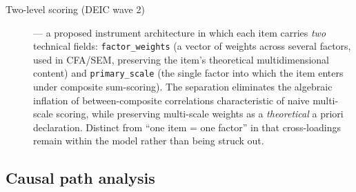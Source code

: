\begin{description}
    \item[Two-level scoring (DEIC wave 2)] --- a proposed instrument architecture in which each item carries \emph{two} technical fields: \texttt{factor\_weights} (a vector of weights across several factors, used in CFA/SEM, preserving the item's theoretical multidimensional content) and \texttt{primary\_scale} (the single factor into which the item enters under composite sum-scoring). The separation eliminates the algebraic inflation of between-composite correlations characteristic of naive multi-scale scoring, while preserving multi-scale weights as a \emph{theoretical} a priori declaration. Distinct from ``one item = one factor'' in that cross-loadings remain within the model rather than being struck out.
\end{description}

\subsection*{Causal path analysis}

